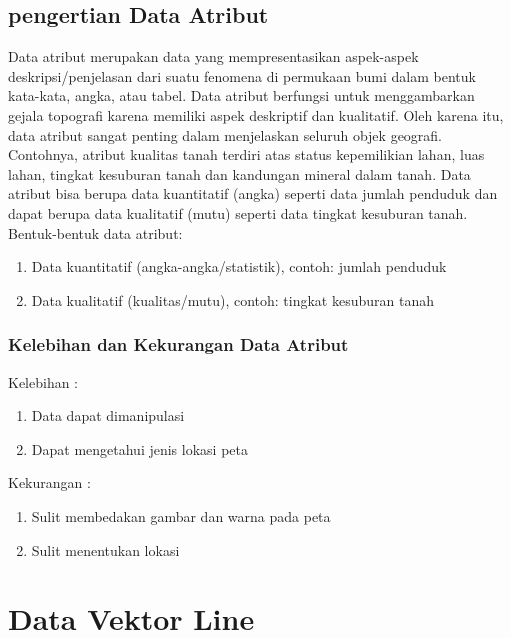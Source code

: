 \subsection{pengertian Data Atribut}
Data atribut merupakan data yang mempresentasikan aspek-aspek deskripsi/penjelasan 
dari suatu fenomena di permukaan bumi dalam bentuk kata-kata, angka, atau tabel. 
Data atribut berfungsi untuk menggambarkan gejala topografi karena memiliki aspek deskriptif dan kualitatif. 
Oleh karena itu, data atribut sangat penting dalam menjelaskan seluruh objek geografi. 
Contohnya, atribut kualitas tanah terdiri atas status kepemilikian lahan, luas lahan, 
tingkat kesuburan tanah dan kandungan mineral dalam tanah. 
Data atribut bisa berupa data kuantitatif (angka) seperti data jumlah penduduk dan dapat berupa data kualitatif (mutu) 
seperti data tingkat kesuburan tanah.  
Bentuk-bentuk data atribut:
\begin{enumerate}
\item	Data kuantitatif (angka-angka/statistik), contoh: jumlah penduduk
\item	Data kualitatif (kualitas/mutu), contoh: tingkat kesuburan tanah
\end{enumerate}

\subsubsection{Kelebihan dan Kekurangan Data Atribut}

Kelebihan :
\begin{enumerate}
   \item Data dapat dimanipulasi 
   \item Dapat mengetahui jenis lokasi peta
\end{enumerate}
Kekurangan :
\begin{enumerate}
   \item Sulit membedakan gambar dan warna pada peta
   \item Sulit menentukan lokasi
\end{enumerate}

\section{Data Vektor Line}
